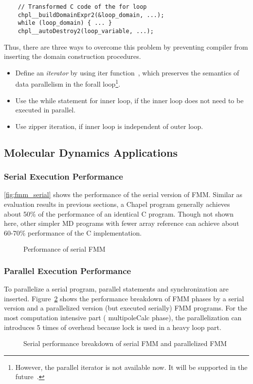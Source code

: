 \begin{lstlisting}
    // Transformed C code of the for loop
    chpl__buildDomainExpr2(&loop_domain, ...);
    while (loop_domain) { ... }
    chpl__autoDestroy2(loop_variable, ...);
\end{lstlisting}

Thus, there are three ways to overcome this problem by preventing compiler from
inserting the domain construction procedures.
\begin{itemize}
  \item Define an {\em iterator} by using {\ic iter} function~\cite{chapelspec},
  which preserves the semantics of data parallelism in the {\ic forall}
  loop\footnote{However, the parallel iterator is not available now. It will be
  supported in the future~\cite{chapelspec}.}. 
  \item Use the {\ic while} statement for inner loop, if the inner loop does not
  need to be executed in parallel.
  \item Use zipper iteration, if inner loop is independent of outer loop.
\end{itemize}

\subsection{Molecular Dynamics Applications}

\subsubsection{Serial Execution Performance}
\autoref{fig:fmm_serial} shows the performance of the serial version of
\ac{FMM}. Similar as evaluation results in previous sections, a Chapel program
generally achieves about 50\% of the performance of an identical C program.
Though not shown here, other simpler \ac{MD} programs with fewer array reference
can achieve about 60-70\% performance of the C implementation.

\begin{figure}[t]
\centering

\caption{Performance of serial \acs{FMM}}
\label{fig:fmm_serial}
\end{figure}

\subsubsection{Parallel Execution Performance}
To parallelize a serial program, parallel statements and synchronization are
inserted. Figure~\ref{fig:fmm_breakdown} shows the performance breakdown of
\ac{FMM} phases by a serial version and a parallelized version (but executed
serially) \ac{FMM} programs. For the most computation intensive part (\ie
{\ic multipoleCalc} phase), the parallelization can introduces 5 times of
overhead because lock is used in a heavy loop part.
\begin{figure}[t]
\centering

\caption{Serial performance breakdown of serial \ac{FMM} and parallelized \ac{FMM}}
\label{fig:fmm_breakdown}
\end{figure}


